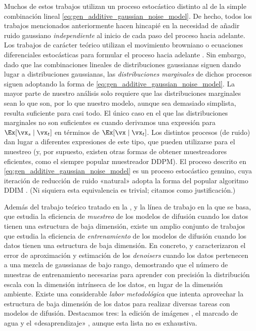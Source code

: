 \documentclass[../../book-main.tex]{subfiles}
\begin{document}
Muchos de estos trabajos utilizan un proceso estocástico distinto al de la
simple combinación lineal
\eqref{eq:gen_additive_gaussian_noise_model}. De hecho, todos los trabajos
mencionados anteriormente hacen hincapié en la necesidad de añadir ruido gaussiano \textit{independiente}
al inicio de cada paso del proceso hacia adelante. Los trabajos de carácter teórico 
utilizan el movimiento browniano o ecuaciones diferenciales estocásticas
para formular el proceso hacia adelante \cite{song2020score}. Sin embargo, dado que 
las combinaciones lineales de distribuciones gaussianas siguen dando lugar a 
distribuciones gaussianas, las \textit{distribuciones marginales} de
dichos procesos siguen adoptando la forma de
\eqref{eq:gen_additive_gaussian_noise_model}. La mayor parte de nuestro análisis
solo requiere que las distribuciones marginales sean lo que son, por lo que
nuestro modelo, aunque sea demasiado simplista, resulta suficiente para casi todo.
El único caso en el que las distribuciones marginales no son suficientes es cuando derivamos
una expresión para \(\Ex[\vx_{s} \mid \vx_{t}]\) en términos de
\(\Ex[\vx \mid \vx_{t}]\). Los distintos procesos (de ruido) dan lugar a
diferentes expresiones de este tipo, que pueden utilizarse para el muestreo (y,
    por supuesto, existen otras formas de obtener muestreadores eficientes, como el
siempre popular muestreador DDPM). El proceso descrito en
\eqref{eq:gen_additive_gaussian_noise_model} es un 
proceso estocástico genuino, cuya iteración de reducción de ruido «natural» adopta la
forma del popular algoritmo DDIM
\cite{song2020denoising}. (Ni siquiera esta equivalencia es trivial;
citamos \cite{de2025distributional} como justificación.)

Además del trabajo teórico \citep{li2024d} tratado en la
, y la línea de trabajo en la que se basa,
que estudia la eficiencia de \textit{muestreo} de los modelos de difusión
cuando los datos tienen una estructura de baja dimensión, existe un amplio
conjunto de trabajos que estudia la eficiencia de \textit{entrenamiento} de
los modelos de difusión cuando los datos tienen una estructura de baja dimensión.
En concreto, \citet{chen2023score} y \citet{wang2024diffusion}
caracterizaron el error de aproximación y estimación de los \textit{denoisers} 
cuando los datos pertenecen a una mezcla de gaussianas de bajo rango, demostrando
que el número de muestras de entrenamiento necesarias para aprender con precisión la
distribución escala con la dimensión intrínseca de los
datos, en lugar de la dimensión ambiente. Existe una considerable
\textit{labor metodológica} que intenta aprovechar la
estructura de baja dimensión de los datos para realizar diversas tareas con
modelos de difusión. Destacamos tres: la edición de imágenes
\citep{chen2024exploring}, el marcado de agua \citep{li2024shallow} y
el «desaprendizaje» \citep{chen2025dual}, aunque esta lista no es exhaustiva.
\end{document}
